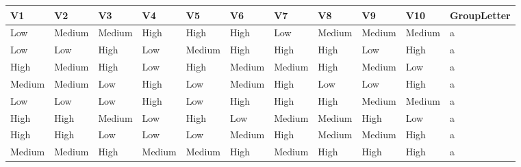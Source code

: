 \documentclass[mathematics,article,submit,moreauthors,pdftex]{mdpi}
\begin{document}
\begin{table}[!ht]
\tiny
\centering
\resizebox{13cm}{!} {
\begin{tabular}{@{}lllllllllll@{}}
\toprule
\textbf{V1}                  & \textbf{V2}                    & \textbf{V3}                  & \textbf{V4}                    & \textbf{V5}                  & \textbf{V6}                    & \textbf{V7}                    & \textbf{V8}                    & \textbf{V9}                    & \textbf{V10}                   & \textbf{GroupLetter}      \\ \midrule
Low      & Medium     & Medium                       & High                           & High                         & High                           & Low                            & Medium                         & Medium                         & Medium                         & a                         \\
Low                          & Low                            & High                         & Low                            & Medium                       & High                           & High                           & High                           & Low                            & High                           & a \\
High & Medium & High & Low    & High & Medium & Medium & High   & Medium & Low    & a                         \\
Medium                       & Medium                         & Low                          & High                           & Low                          & Medium                         & High                           & Low                            & Low                            & High                           & a \\
Low  & Low    & Low  & High   & Low  & High   & High   & High   & Medium & Medium & a                         \\
High                         & High                           & Medium                       & Low                            & High                         & Low                            & Medium                         & Medium                         & High                           & Low                            & a \\
High & High   & Low  & Low    & Low  & Medium & High   & Medium & Medium & High   & a                         \\
Medium                       & Medium                         & High                         & Medium                         & Medium                       & High                           & Medium                         & High                           & High                           & High                           & a \\

\end{tabular}}
\end{table}
\end{document}
